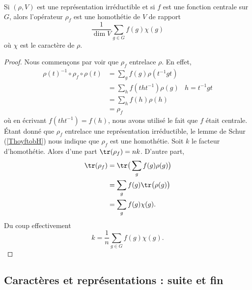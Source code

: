 \begin{proposition}  \label{PropEAXkAY}
    Si \( (\rho,V)\) est une représentation irréductible et si \( f\) est une fonction centrale sur \( G\), alors l'opérateur \( \rho_f\) est une homothétie de \( V\) de rapport
    \begin{equation}
        \frac{1}{ \dim V }\sum_{g\in G}f(g)\chi(g)
    \end{equation}
    où \( \chi\) est le caractère de \( \rho\).
\end{proposition}

\begin{proof}
    Nous commençons par voir que \( \rho_f\) entrelace \( \rho\). En effet,
    \begin{subequations}
        \begin{align}
            \rho(t)^{-1}\circ\rho_f\circ\rho(t)&=\sum_gf(g)\rho(t^{-1}gt)\\
            &=\sum_hf(tht^{-1})\rho(g)      & h=t^{-1}gt\\
            &=\sum_hf(h)\rho(h)\\
            &=\rho_f
        \end{align}
    \end{subequations}
    où en écrivant \( f(tht^{-1})=f(h)\), nous avons utilisé le fait que \( f\) était centrale. Étant donné que \( \rho_f\) entrelace une représentation irréductible, le lemme de Schur (\ref{ThoyftobH}) nous indique que \( \rho_f\) est une homothétie. Soit \( k\) le facteur d'homothétie. Alors d'une part \( \tr(\rho_f)=nk\). D'autre part,
    \begin{subequations}
        \begin{align}
            \tr(\rho_f)&=\tr\big( \sum_gf(g)\rho(g) \big)\\
            &=\sum_gf(g)\tr\big( \rho(g) \big)\\
            &=\sum_gf(g)\chi(g).
        \end{align}
    \end{subequations}
    Du coup effectivement 
    \begin{equation}
        k=\frac{1}{ n }\sum_{g\in G}f(g)\chi(g).
    \end{equation}
\end{proof}

\subsection{Caractères et représentations : suite et fin}


